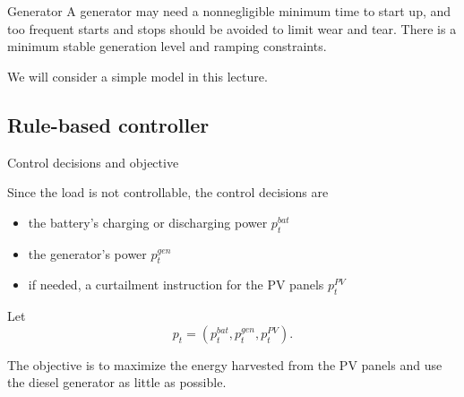 \begin{frame}{Generator}
 A generator may need a nonnegligible minimum time to start up, and too frequent starts and stops should be avoided to limit wear and tear.
 There is a minimum stable generation level and ramping constraints.

 We will consider a simple model in this lecture.
\end{frame}




\subsection{Rule-based controller}

\begin{frame}{Control decisions and objective}

Since the load is not controllable, the \alert{control decisions} are 
\begin{itemize}
    \item the battery's charging or discharging power $p^{bat}_t$
    \item the generator's power $p^{gen}_t$
    \item if needed, a curtailment instruction for the PV panels $p^{PV}_t$
\end{itemize}
Let $$p_t = (p^{bat}_t, p^{gen}_t, p^{PV}_t).$$


The \alert{objective} is to maximize the energy harvested from the PV panels and use the diesel generator as little as possible. 

\end{frame}

